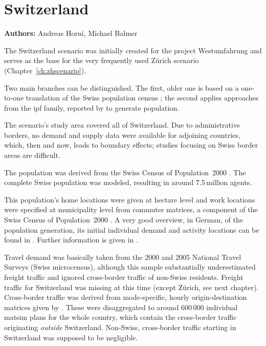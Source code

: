 \chapter{Switzerland}
\label{ch:switzerland-scenario}
\hfill \textbf{Authors:} Andreas Horni, Michael Balmer


The Switzerland scenario was initially created for the project Westumfahrung \citep[][]{BalmerEtAl_ResRep_bdktzrh_2009} and serves as the base for the very frequently used Zürich scenario (Chapter~\ref{ch:zhscenario}). 

Two main branches can be distinguished. The first, older one is based on a one-to-one translation of the Swiss population census \citep[][]{BfS_VZ_2000}; the second applies approaches from the \gls{ipf} family, reported by \citet[][]{MuellerKAxhausen_TechRep_IVT_2013, Mueller_unpub_LATSIS_2012, Mueller_unpub_ETC_2011, Mueller_unpub_STRC_2011, Mueller_unpub_IATBR_2012} to generate population.

The scenario's study area covered all of Switzerland. Due to administrative borders, no demand and supply data were available for adjoining countries, which, then and now, leads to boundary effects; studies focusing on Swiss border areas are difficult.

The population was derived from the Swiss Census of Population~2000 \citep[][]{BfS_VZ_2000}. The complete Swiss population was modeled, resulting in around 7.5\,million agents. 

This population's home locations were given at hectare level and work locations were specified at municipality level from commuter matrices, a component of the Swiss Census of Population~2000 \citep[][p.35]{BalmerEtAl_ResRep_bdktzrh_2009}. A very good overview, in German, of the population generation, its initial individual demand and activity locations can be found in \citet{MeisterEtAl_SVT_2009}. Further information is given in \citet[][]{CiariEtAl_STRC_2008, MeisterEtAl_WCTRS_2010, BalmerEtAl_ResRep_bdktzrh_2009, BalmerEtAl_ResRep_datapuls_2010, BalmerEtAl_HEUREKA_2008}.

Travel demand was basically taken from the 2000 and 2005 National Travel Surveys \citep[][]{BfS-MZ2005_manual_2006} (Swiss microcensus), although this sample substantially underestimated freight traffic and ignored cross-border traffic of non-Swiss residents. Freight traffic for Switzerland was missing at this time (except Zürich, see next chapter). Cross-border traffic was derived from mode-specific, hourly origin-destination matrices given by \citet[][]{VrticEtAl_ResRep_UVEK_2007}. These were disaggregated to around 600\,000 individual \gls{matsim} plans for the whole country, which contain the cross-border traffic originating \emph{outside} Switzerland. Non-Swiss, cross-border traffic starting in Switzerland was supposed to be negligible. 

